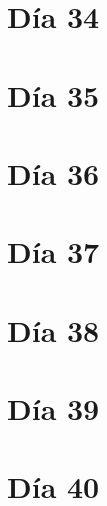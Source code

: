\documentclass[11pt]{report}
\theoremstyle{plain}
\theoremstyle{definition}
\begin{document}
\section{Día 34}
\section{Día 35}
\section{Día 36}
\section{Día 37}
\section{Día 38}
\section{Día 39}
\section{Día 40}

\end{document}
